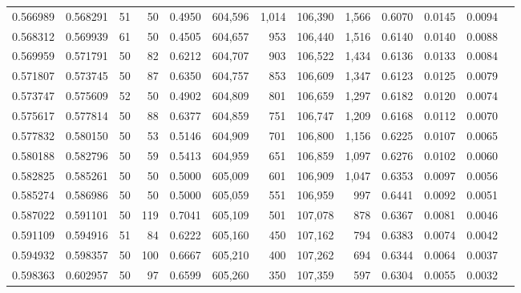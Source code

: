 \begin{tabular}{rrrrrrrrrrrrr}
0.566989 & 0.568291 &    51 &  50 &                                     0.4950 & 604,596 &   1,014 & 106,390 &   1,566 & 0.6070 & 0.0145 & 0.0094 \\
0.568312 & 0.569939 &    61 &  50 &                                     0.4505 & 604,657 &     953 & 106,440 &   1,516 & 0.6140 & 0.0140 & 0.0088 \\
0.569959 & 0.571791 &    50 &  82 &                                     0.6212 & 604,707 &     903 & 106,522 &   1,434 & 0.6136 & 0.0133 & 0.0084 \\
0.571807 & 0.573745 &    50 &  87 &                                     0.6350 & 604,757 &     853 & 106,609 &   1,347 & 0.6123 & 0.0125 & 0.0079 \\
0.573747 & 0.575609 &    52 &  50 &                                     0.4902 & 604,809 &     801 & 106,659 &   1,297 & 0.6182 & 0.0120 & 0.0074 \\
0.575617 & 0.577814 &    50 &  88 &                                     0.6377 & 604,859 &     751 & 106,747 &   1,209 & 0.6168 & 0.0112 & 0.0070 \\
0.577832 & 0.580150 &    50 &  53 &                                     0.5146 & 604,909 &     701 & 106,800 &   1,156 & 0.6225 & 0.0107 & 0.0065 \\
0.580188 & 0.582796 &    50 &  59 &                                     0.5413 & 604,959 &     651 & 106,859 &   1,097 & 0.6276 & 0.0102 & 0.0060 \\
0.582825 & 0.585261 &    50 &  50 &                                     0.5000 & 605,009 &     601 & 106,909 &   1,047 & 0.6353 & 0.0097 & 0.0056 \\
0.585274 & 0.586986 &    50 &  50 &                                     0.5000 & 605,059 &     551 & 106,959 &     997 & 0.6441 & 0.0092 & 0.0051 \\
0.587022 & 0.591101 &    50 & 119 &                                     0.7041 & 605,109 &     501 & 107,078 &     878 & 0.6367 & 0.0081 & 0.0046 \\
0.591109 & 0.594916 &    51 &  84 &                                     0.6222 & 605,160 &     450 & 107,162 &     794 & 0.6383 & 0.0074 & 0.0042 \\
0.594932 & 0.598357 &    50 & 100 &                                     0.6667 & 605,210 &     400 & 107,262 &     694 & 0.6344 & 0.0064 & 0.0037 \\
0.598363 & 0.602957 &    50 &  97 &                                     0.6599 & 605,260 &     350 & 107,359 &     597 & 0.6304 & 0.0055 & 0.0032 \\

\end{tabular}
